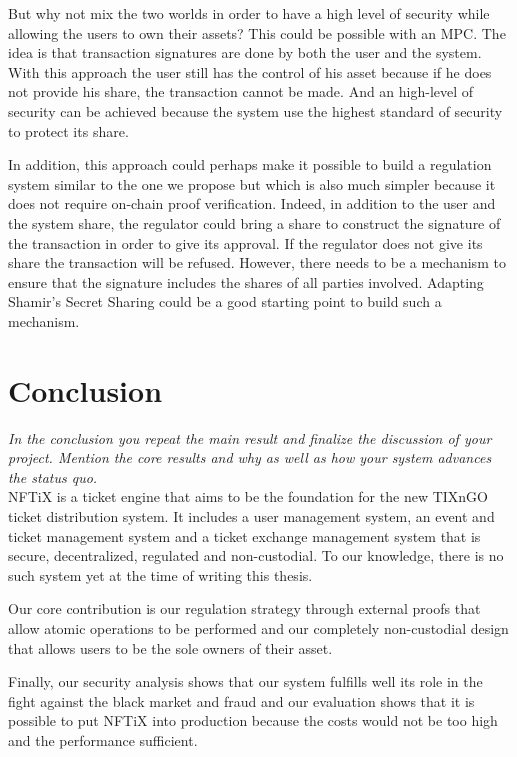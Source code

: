 \documentclass[a4paper,11pt,oneside]{report}
\begin{document}
But why not mix the two worlds in order to have a high level of security while allowing the users to own their assets? This could be possible with an MPC. The idea is that transaction signatures are done by both the user and the system. With this approach the user still has the control of his asset because if he does not provide his share, the transaction cannot be made. And an high-level of security can be achieved because the system use the highest standard of security to protect its share.

In addition, this approach could perhaps make it possible to build a regulation system similar to the one we propose but which is also much simpler because it does not require on-chain proof verification. Indeed, in addition to the user and the system share, the regulator could bring a share to construct the signature of the transaction in order to give its approval. If the regulator does not give its share the transaction will be refused. However, there needs to be a mechanism to ensure that the signature includes the shares of all parties involved. Adapting Shamir's Secret Sharing could be a good starting point to build such a mechanism.

\chapter{Conclusion}

\textit{In the conclusion you repeat the main result and finalize the discussion of
your project. Mention the core results and why as well as how your system
advances the status quo.} \\

NFTiX is a ticket engine that aims to be the foundation for the new TIXnGO ticket distribution system. It includes a user management system, an event and ticket management system and a ticket exchange management system that is secure, decentralized, regulated and non-custodial. To our knowledge, there is no such system yet at the time of writing this thesis.

Our core contribution is our regulation strategy through external proofs that allow atomic operations to be performed and our completely non-custodial design that allows users to be the sole owners of their asset.

Finally, our security analysis shows that our system fulfills well its role in the fight against the black market and fraud and our evaluation shows that it is possible to put NFTiX into production because the costs would not be too high and the performance sufficient.
\end{document}
